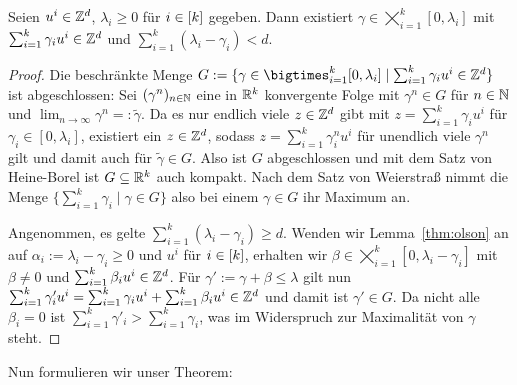 \begin{lemma}\label{lem:maxgamma}
	Seien $u^i\in\mathbb{Z}^d$, $\lambda_i\geq0$ für $i\in[k]$ gegeben.
	Dann existiert $\gamma\in\bigtimes_{i=1}^k [0,\lambda_i]$ mit $\sum_{i=1}^k \gamma_i u^i\in\mathbb{Z}^d$ und  $\sum_{i=1}^k(\lambda_i-\gamma_i)<d$.
\end{lemma}
\begin{proof}
	Die beschränkte Menge $G:=\{\gamma \in \bigtimes_{i=1}^k [0,\lambda_i] \mid \sum_{i=1}^k \gamma_i u^i\in\Z^d \}$ ist abgeschlossen: Sei $(\gamma^n)_{n\in\mathbb{N}}$ eine in $\mathbb{R}^k$ konvergente Folge mit $\gamma^n\in G$ für $n\in\mathbb{N}$ und $\lim_{n\to\infty}\gamma^n=:\tilde{\gamma}$.
	Da es nur endlich viele $z\in\mathbb{Z}^d$ gibt mit $z=\sum_{i=1}^k\gamma_iu^i$ für $\gamma_i\in[0,\lambda_i]$, existiert ein $z\in\mathbb{Z}^d$, sodass $z=\sum_{i=1}^k\gamma^n_iu^i$ für unendlich viele $\gamma^n$ gilt und damit auch für $\tilde{\gamma}\in G$.
	Also ist $G$ abgeschlossen und mit dem Satz von Heine-Borel ist $G\subseteq\mathbb{R}^k$ auch kompakt.
	Nach dem Satz von Weierstraß nimmt die Menge $\{ \sum_{i=1}^k\gamma_i \mid \gamma\in G \}$ also bei einem $\gamma\in G$ ihr Maximum an.
	
	Angenommen, es gelte $\sum_{i=1}^k(\lambda_i - \gamma_i) \geq d$.
	Wenden wir Lemma~\ref{thm:olson} an auf $\alpha_i:=\lambda_i-\gamma_i\geq0$ und $u^i$ für $i\in[k]$, erhalten wir $\beta\in\bigtimes_{i=1}^k[0,\lambda_i-\gamma_i]$ mit $\beta\neq0$ und $\sum_{i=1}^k \beta_i u^i\in\mathbb{Z}^d$.
	Für $\gamma':=\gamma+\beta\leq\lambda$ gilt nun 
	$
	\sum_{i=1}^k\gamma'_iu^i = \sum_{i=1}^k\gamma_iu^i + \sum_{i=1}^k \beta_iu^i\in\mathbb{Z}^d
	$
	und damit ist $\gamma'\in G$.
	Da nicht alle $\beta_i=0$ ist $\sum_{i=1}^k\gamma'_i > \sum_{i=1}^k\gamma_i$, was im Widerspruch zur Maximalität von $\gamma$ steht.
\end{proof}
Nun formulieren wir unser Theorem:

